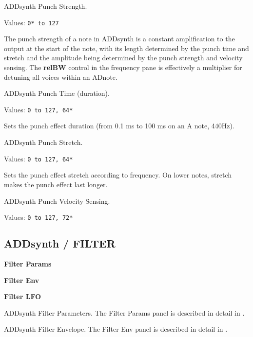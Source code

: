    ADDsynth Punch Strength.

   Values: \texttt{0* to 127}

   The punch strength of a note in ADDsynth is a constant amplification to
   the output at the start of the note, with its length determined by the
   punch time and stretch and the amplitude being determined by the punch
   strength and velocity sensing. The \textbf{relBW}
   control in the frequency pane is
   effectively a multiplier for detuning all voices within an ADnote.

   ADDsynth Punch Time (duration).

   Values: \texttt{0 to 127, 64*}

   Sets the punch effect duration (from 0.1 ms to 100 ms on an A note, 440Hz).

   ADDsynth Punch Stretch.

   Values: \texttt{0 to 127, 64*}

   Sets the punch effect stretch according to frequency. On lower notes,
   stretch makes the punch effect last longer. 

   ADDsynth Punch Velocity Sensing.

   Values: \texttt{0 to 127, 72*}

\subsection{ADDsynth / FILTER}
\label{subsec:addsynth_filter}

   \begin{enumber}
      \item \textbf{Filter Params}
      \item \textbf{Filter Env}
      \item \textbf{Filter LFO}
   \end{enumber}

   \setcounter{ItemCounter}{0}      %

   ADDsynth Filter Parameters.
   The Filter Params panel is described in detail in
   .

   ADDsynth Filter Envelope.
   The Filter Env panel is described in detail in
   .

